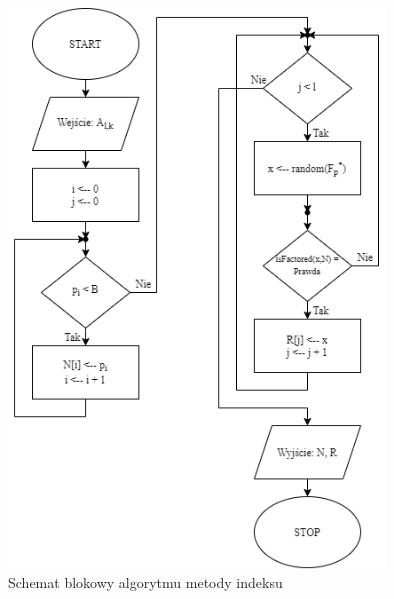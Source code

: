 \documentclass[]{article}
\begin{document}
	\begin{figure}[h]
	\begin{center}
		\includegraphics[width=10cm]{./img/2.png}
		\caption{Schemat blokowy algorytmu metody indeksu}
	\end{center}
\end{figure}
\end{document}
